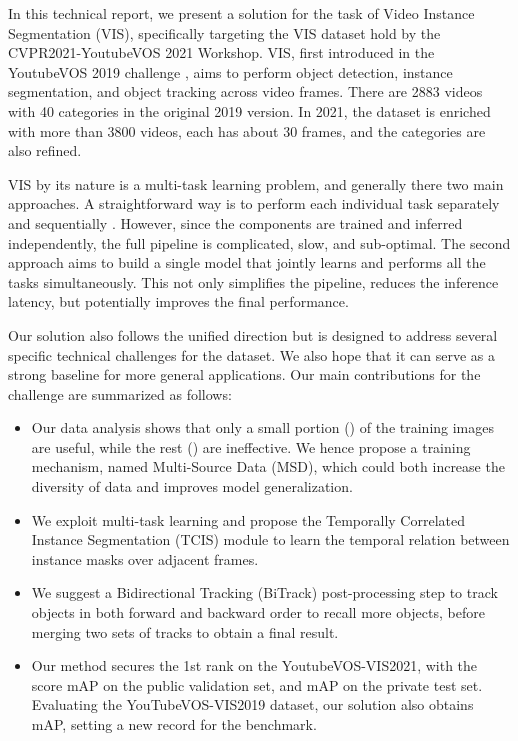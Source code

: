 \documentclass[10pt,twocolumn,letterpaper]{article}
\begin{document}
In this technical report, we present a solution for the task of Video Instance Segmentation (VIS), specifically targeting the VIS dataset hold by the CVPR2021-YoutubeVOS 2021 Workshop. VIS, first introduced in the YoutubeVOS 2019 challenge \cite{vis}, aims to perform object detection, instance segmentation, and object tracking across video frames. There are 2883 videos with 40 categories in the original 2019 version. In 2021, the dataset is enriched with more than 3800 videos, each has about 30 frames, and the categories are also refined.

VIS by its nature is a multi-task learning problem, and generally there two main approaches. A straightforward way is to perform each individual task separately and sequentially \cite{2019vis_first}. However, since the components are trained and inferred independently, the full pipeline is complicated, slow, and sub-optimal. The second approach \cite{vis_2018_second, vis_2018_third, vis_2018_x} aims to build a single model that jointly learns and performs all the tasks simultaneously. This not only simplifies the pipeline, reduces the inference latency, but potentially improves the final performance.

Our solution also follows the unified direction but is designed to address several specific technical challenges for the dataset. We also hope that it can serve as a strong baseline for more general applications. Our main contributions for the challenge are summarized as follows:

\begin{itemize}
\item Our data analysis shows that only a small portion () of the training images are useful, while the rest () are ineffective. We hence propose a training mechanism, named Multi-Source Data (MSD), which could both increase the diversity of data and improves model generalization.

\item We exploit multi-task learning and propose the Temporally Correlated Instance Segmentation (TCIS) module to learn the temporal relation between instance masks over adjacent frames.

\item We suggest a Bidirectional Tracking (BiTrack) post-processing step to track objects in both forward and backward order to recall more objects, before merging two sets of tracks to obtain a final result.

\item Our method secures the 1st rank on the YoutubeVOS-VIS2021, with the score  mAP on the public validation set, and  mAP on the private test set. Evaluating the YouTubeVOS-VIS2019 dataset, our solution also obtains  mAP, setting a new record for the benchmark.
\end{itemize}
\end{document}
